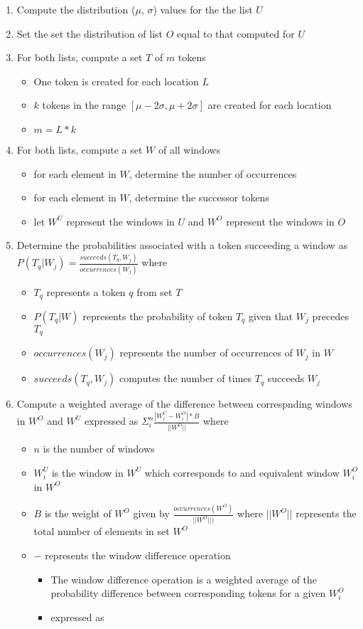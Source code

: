 \begin{enumerate}
\item Compute the distribution ($\mu$, $\sigma$) values for the 
  the list $U$
\item Set the set the distribution of list $O$ equal to that 
  computed for $U$
\item For both lists, compute a set $T$ of $m$ tokens
  \begin{itemize}
  \item One token is created for each location $L$ 
  \item $k$ tokens in the range $[\mu-2\sigma, \mu+2\sigma]$
    are created for each location
  \item $m = L * k$
  \end{itemize}
\item For both lists, compute a set $W$ of all windows
  \begin{itemize}
  \item for each element in $W$, determine the number of occurrences
  \item for each element in $W$, determine the successor tokens
  \item let $W^U$ represent the windows in $U$ and
    $W^O$ represent the windows in $O$
  \end{itemize}
\item Determine the probabilities associated with a token succeeding a window
  as $P(T_q|W_j) = \frac{succeeds(T_q, W_j)}{occurrences(W_j)}$ where
  \begin{itemize}
  \item $T_q$ represents a token $q$ from set $T$
  \item $P(T_q|W)$ represents the probability 
    of token $T_q$ given that $W_j$ precedes $T_q$
  \item $occurrences(W_j)$ represents the number of occurrences of $W_j$ in $W$
  \item $succeeds(T_q, W_j)$ computes the number of times $T_q$ succeeds $W_j$
  \end{itemize}
\item Compute a weighted average of the difference between correspnding windows
  in $W^O$ and $W^U$ expressed as $\Sigma_i^n \frac{|W_i^U-W_i^O| * B}{||W^O||}$ where
  \begin{itemize}
  \item $n$ is the number of windows
  \item $W_i^U$ is the window in $W^U$ which corresponds to
    and equivalent window $W_i^O$ in $W^O$
  \item $B$ is the weight of $W^O$ given by $\frac{occurrences(W^O)}{||W^O||)}$
    where $||W^O||$ represents the total number of elements in set $W^O$
  \item $-$ represents the window difference operation
    \begin{itemize}
    \item The window difference operation is
      a weighted average of the probability difference
      between corresponding tokens for a given $W_i^O$
    \item expressed as 
    \end{itemize}
  \end{itemize}
\end{enumerate}
